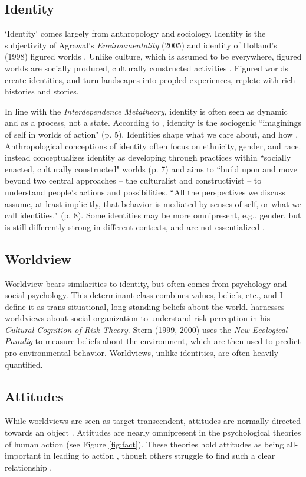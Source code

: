 \documentclass[12 pt]{article}
\begin{document}
		\subsection{Identity}
		`Identity' comes largely from anthropology and sociology. Identity is the subjectivity of Agrawal's \textit{Environmentality} (2005) and identity of Holland's (1998) figured worlds .  Unlike culture, which is assumed to be everywhere, figured worlds are socially produced, culturally  constructed activities \parencite{Holland1998}. Figured worlds create identities, and turn landscapes into peopled  experiences, replete with rich histories and stories.  
		
			
		In line with the \textit{Interdependence Metatheory}, identity is often seen as dynamic and as a process, not a state. According to \parencite{Holland1998}, identity is the sociogenic ``imaginings of self in worlds of action" (p. 5). Identities shape what we care about, and how . Anthropological conceptions of identity often focus on ethnicity, gender, and race. \textcite{Holland1998} instead conceptualizes identity as developing through practices within ``socially enacted, culturally constructed" worlds (p. 7) and aims to ``build upon and move beyond two central approaches -- the culturalist and constructivist -- to understand people's actions and possibilities. ``All the perspectives we discuss assume, at least implicitly, that behavior is mediated by senses of self, or what we call identities." (p. 8).  Some identities may be more omnipresent, e.g., gender, but is still differently strong in different contexts, and are not essentialized \parencite{Agarwal1992}.
	
		\subsection{Worldview}
		Worldview bears similarities to identity, but often comes from psychology and social psychology. This determinant class combines values, beliefs, etc., and I define it as trans-situational, long-standing beliefs about the world. \textcite{Kahan2011} harnesses worldviews about social organization to understand risk perception in his \textit{Cultural Cognition of Risk Theory}. Stern (1999, 2000) uses the \textit{New Ecological Paradig} to measure beliefs about the environment, which are then used to predict pro-environmental behavior.  Worldviews, unlike identities, are often heavily quantified.  
		\subsection{Attitudes}
		While worldviews are seen as target-transcendent, attitudes are normally directed towards an object \parencite{Hitlin2004}.  Attitudes are nearly omnipresent in the psychological theories of human action (see Figure \ref{fig:fact}). These theories hold attitudes as being all-important in leading to action \parencite{Kraus1995}, though others struggle to find such a clear relationship \parencite{Sniehotta2014}. 
\end{document}
